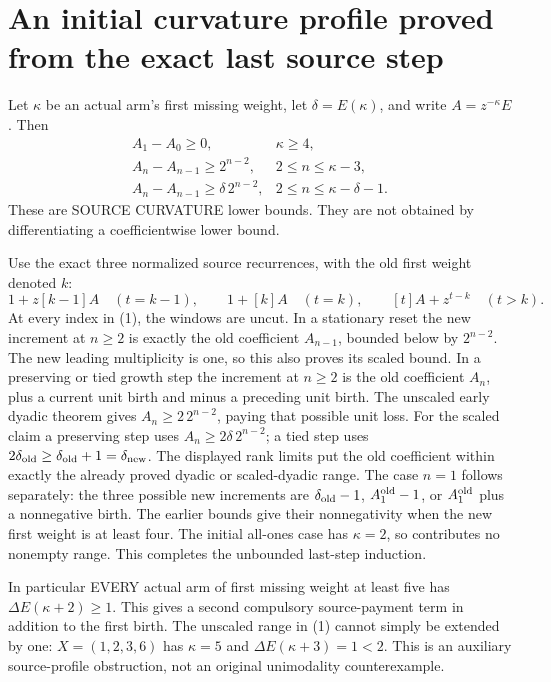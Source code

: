 \section{An initial curvature profile proved from the exact last source step}
Let $\kappa$ be an actual arm's first missing weight, let
$\delta=E(\kappa)$, and write $A=z^{-\kappa}E$.
Then
\[
\begin{array}{ll}
A_1-A_0\ge0,&\kappa\ge4,\\
A_n-A_{n-1}\ge2^{n-2},&2\le n\le\kappa-3,\\
A_n-A_{n-1}\ge\delta\,2^{n-2},&2\le n\le\kappa-\delta-1.
\end{array}                                                   \tag{1}
\]
These are SOURCE CURVATURE lower bounds. They are not obtained by
differentiating a coefficientwise lower bound.

Use the exact three normalized source recurrences, with the old
first weight denoted $k$:
\[
 1+z[k-1]A\quad(t=k-1),\qquad
 1+[k]A\quad(t=k),\qquad
 [t]A+z^{t-k}\quad(t>k).
\]
At every index in (1), the windows are uncut.
In a stationary reset the new increment at $n\ge2$ is exactly
the old coefficient $A_{n-1}$, bounded below by $2^{n-2}$.
The new leading multiplicity is one, so this also proves its scaled bound.
In a preserving or tied growth step the increment at $n\ge2$ is
the old coefficient $A_n$, plus a current unit birth and minus
a preceding unit birth. The unscaled early dyadic theorem gives
$A_n\ge2\,2^{n-2}$, paying that possible unit loss.
For the scaled claim a preserving step uses
$A_n\ge2\delta\,2^{n-2}$; a tied step uses
$2\delta_{\rm old}\ge\delta_{\rm old}+1=\delta_{\rm new}$.
The displayed rank limits put the old coefficient within exactly
the already proved dyadic or scaled-dyadic range.
The case $n=1$ follows separately: the three possible new
increments are $\delta_{\rm old}-1$, $A_1^{\rm old}-1$, or
$A_1^{\rm old}$ plus a nonnegative birth. The earlier bounds give
their nonnegativity when the new first weight is at least four.
The initial all-ones case has $\kappa=2$, so contributes no
nonempty range. This completes the unbounded last-step induction.

In particular EVERY actual arm of first missing weight at least
five has $\Delta E(\kappa+2)\ge1$. This gives a second compulsory
source-payment term in addition to the first birth.
The unscaled range in (1) cannot simply be extended by one:
$X=(1,2,3,6)$ has $\kappa=5$ and
$\Delta E(\kappa+3)=1<2$.
This is an auxiliary source-profile obstruction, not an original
unimodality counterexample.

